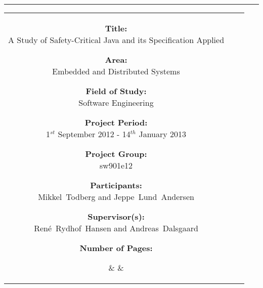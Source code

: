 \begin{titlepage}

\begin{center}
\begin{tabular}{c}
\end{tabular}
\end{center}
\vspace{-3mm}
\hrule

\vspace{5mm}

\hspace{-10mm}
\begin{tabular}{ccc}

\parbox{45mm}{
  \footnotesize
  \begin{description}
  
  \item{\textbf{Title:}          \\ A Study of Safety-Critical Java and its Specification Applied}
  \item{\textbf{Area:}           \\ Embedded and Distributed Systems}
  \item{\textbf{Field of Study:} \\ Software Engineering}
  \item{\textbf{Project Period:} \\ 1$^{st}$ September 2012 - 14$^{th}$ January 2013}
  \item{\textbf{Project Group:}  \\ sw901e12}
  \item{\textbf{Participants:}   \\ Mikkel~Todberg and Jeppe~Lund~Andersen}
  \item{\textbf{Supervisor(s):}  \\ Ren\'{e}~Rydhof~Hansen and Andreas~Dalsgaard}

  \item{\textbf{Number of Pages:} \\ \pageref{LastPage}}

  \end{description}
}

&
\hspace{5mm}
&

\fbox{
  \parbox{65mm}{
    \footnotesize
    
  }
}

\end{tabular}

\end{titlepage}
